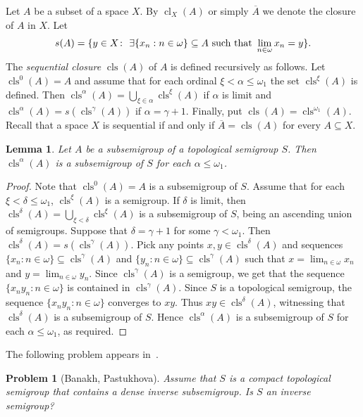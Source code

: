 \documentclass[12pt, twoside, leqno]{article}
\newtheorem{lemma}[theorem]{Lemma}
\newtheorem{problem}[theorem]{Problem}
\theoremstyle{definition}
\numberwithin{equation}{section}
\newcommand{\w}{\omega}
\newcommand{\cl}{\operatorname{cl}}
\newcommand{\cls}{\operatorname{cls}}
\begin{document}
Let $A$ be a subset of a space $X$. By $\cl_X(A)$ or simply $\overline{A}$ we denote the closure of $A$ in $X$.
Let $$s(A)=\{y\in X\colon \hbox{ }\exists\{x_n: n\in\w\}\subseteq A \hbox{ such that }\lim_{n\in\w}x_n=y\}.$$
The {\em sequential closure} $\cls(A)$ of $A$ is defined recursively as follows. Let $\cls^0(A)=A$ and assume that for each ordinal $\xi<\alpha\leq\omega_1$ the set $\cls^{\xi}(A)$ is defined. Then $\cls^\alpha(A)=\bigcup_{\xi\in\alpha}\cls^{\xi}(A)$ if $\alpha$ is limit and $\cls^{\alpha}(A)=s(\cls^{\gamma}(A))$ if $\alpha=\gamma+1$. Finally, put $\cls(A)=\cls^{\w_1}(A)$. 
Recall that a space $X$ is sequential if and only if $\overline A=\cls(A)$ for every $A\subseteq X$.

\begin{lemma}\label{cls}
Let $A$ be a subsemigroup of a topological semigroup $S$. Then $\cls^{\alpha}(A)$ is a subsemigroup of $S$ for each $\alpha\leq\w_1$.
\end{lemma}

\begin{proof}
Note that $\cls^0(A)=A$ is a subsemigroup of $S$. Assume that for each $\xi<\delta\leq \w_1$, $\cls^\xi(A)$ is a semigroup. If $\delta$ is limit, then $\cls^{\delta}(A)=\bigcup_{\xi<\delta}\cls^\xi(A)$ is a subsemigroup of $S$, being an ascending union of semigroups. Suppose that $\delta=\gamma+1$ for some $\gamma<\w_1$. Then $\cls^\delta(A)=s(\cls^\gamma(A))$. Pick any points $x,y\in \cls^\delta(A)$ and  sequences $\{x_n: n\in\w\}\subseteq \cls^\gamma(A)$ and $\{y_n: n\in\w\}\subseteq \cls^\gamma(A)$ such that $x=\lim_{n\in\w}x_n$ and $y=\lim_{n\in\w}y_n$.
Since $\cls^\gamma(A)$ is a semigroup, we get that the sequence $\{x_ny_n: n\in\w\}$ is contained in $\cls^\gamma(A)$.
Since $S$ is a topological semigroup, the sequence $\{x_ny_n: n\in\w\}$ converges to $xy$. Thus $xy\in \cls^\delta(A)$, witnessing that $\cls^\delta(A)$ is a subsemigroup of $S$. Hence $\cls^{\alpha}(A)$ is a subsemigroup of $S$ for each $\alpha\leq\w_1$, as required.     
\end{proof}


The following problem appears in~\cite[Problem 2.2]{BP}.

\begin{problem}[Banakh, Pastukhova]\label{BP}
Assume that $S$ is a compact topological semigroup that contains a dense inverse subsemigroup. Is $S$ an inverse semigroup?
\end{problem}
\end{document}
